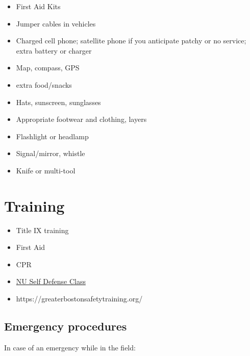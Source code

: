 \documentclass[
  letterpaper,
  DIV=11,
  numbers=noendperiod]{scrreprt}
\begin{document}
\begin{itemize}
\item
  First Aid Kits
\item
  Jumper cables in vehicles
\item
  Charged cell phone; satellite phone if you anticipate patchy or no
  service; extra battery or charger
\item
  Map, compass, GPS
\item
  extra food/snacks
\item
  Hats, sunscreen, sunglasses
\item
  Appropriate footwear and clothing, layers
\item
  Flashlight or headlamp
\item
  Signal/mirror, whistle
\item
  Knife or multi-tool
\end{itemize}

\hypertarget{training}{%
\section*{\texorpdfstring{\textbf{Training}}{Training}}\label{training}}

\begin{itemize}
\item
  Title IX training
\item
  First Aid
\item
  CPR
\item
  \href{https://nupd.northeastern.edu/our-services/safety-training/}{NU
  Self Defense Class}
\item
  https://greaterbostonsafetytraining.org/
\end{itemize}

\hypertarget{emergency-procedures}{%
\subsection*{\texorpdfstring{\textbf{Emergency
procedures}}{Emergency procedures}}\label{emergency-procedures}}

In case of an emergency while in the field:
\end{document}

